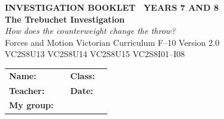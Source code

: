 \documentclass[11pt,a4paper]{article}
\newif\ifteacher
\begin{document}
\setlength{\parindent}{0pt}
\setlength{\parskip}{4pt}

\thispagestyle{plain}
\ifteacher
  \def\coverstamp{\node[anchor=north east, fill=ScaffoldRed, text=white, font=\headingfont\bfseries\small,
    rounded corners=2pt, inner sep=4pt] at ([xshift=-4mm, yshift=-4mm]frame.north east) {TEACHER COPY --- answers in red};}
\else
  \def\coverstamp{}
\fi
\begin{tcolorbox}[
  enhanced, breakable=false, arc=4mm,
  colback=NavyBlue, colframe=NavyBlue,
  left=6mm, right=6mm, top=9mm, bottom=9mm,
  boxrule=0pt, overlay={\coverstamp}
]
  \begin{center}
    {\headingfont\bfseries\color{Sky}\footnotesize\MakeUppercase{Investigation Booklet \textbullet\ Years 7 and 8}}\\[10pt]
    {\headingfont\bfseries\color{white}\fontsize{36}{42}\selectfont The Trebuchet Investigation}\\[8pt]
    {\large\color{white!85!NavyBlue}\itshape How does the counterweight change the throw?}\\[14pt]
    {\headingfont\color{white!72!NavyBlue}\normalsize Forces and Motion \textbar{} Victorian Curriculum F--10 Version 2.0\\[2pt]
     VC2S8U13 \textbar{} VC2S8U14 \textbar{} VC2S8U15 \textbar{} VC2S8I01--I08}
  \end{center}
\end{tcolorbox}

\vspace{10pt}

\begin{tabular}{@{}p{2.3cm} p{6.6cm} p{1.5cm} p{4.4cm}@{}}
  \textbf{Name:}    & \underline{\hspace{6.4cm}} & \textbf{Class:} & \underline{\hspace{4.2cm}} \\[10pt]
  \textbf{Teacher:} & \underline{\hspace{6.4cm}} & \textbf{Date:}  & \underline{\hspace{4.2cm}} \\[10pt]
  \textbf{My group:} & \multicolumn{3}{l}{\underline{\hspace{12.6cm}}} \\
\end{tabular}
\end{document}
